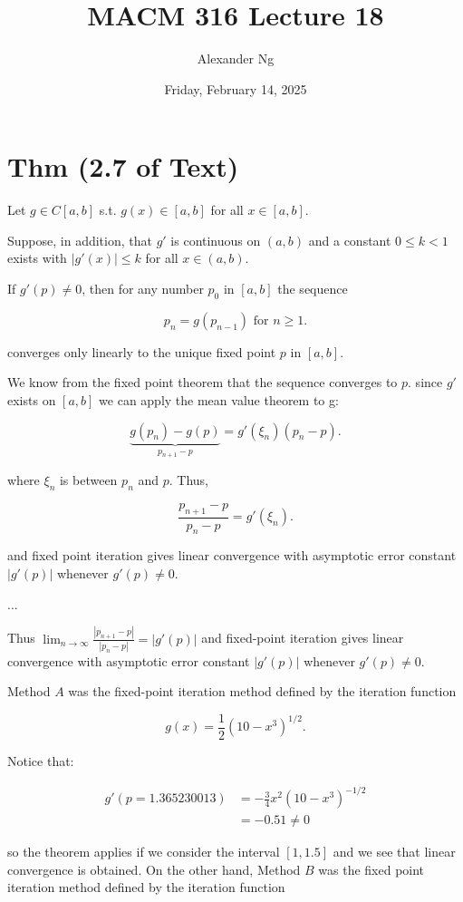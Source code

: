 \documentclass[12pt]{article}
\begin{document}
\title{MACM 316 Lecture 18}
\author{Alexander Ng}
\date{Friday, February 14, 2025}

\maketitle

\section{Thm (2.7 of Text)}

Let $g\in C[a,b]$ s.t. $g(x) \in [a, b]$ for all $x \in [a, b]$.

Suppose, in addition, that $g'$ is continuous on $(a,b)$ and a constant
$0\leq k<1$ exists with $|g'(x)|\leq k$ for all $x\in (a,b)$.

If $g'(p) \neq 0$, then for any number $p_0$ in $[a,b]$ the sequence 

\[
  p_n = g(p_{n-1}) \text{ for } n\geq 1
.\]

converges only linearly to the unique fixed point $p$ in $[a,b]$.

\proof We know from the fixed point theorem that the sequence converges to $p$.
since $g'$ exists on $[a,b]$ we can apply the mean value theorem to g:

\[
\underbrace{g(p_n) - g(p)}_{p_{n+1} - p} = g'(\xi_n)(p_n - p)
.\]

where $\xi_n$ is between $p_n$ and $p$. Thus,

\[
  \frac{p_{n+1}-p}{p_n-p} = g'(\xi_n)
.\]

and fixed point iteration gives linear convergence with asymptotic error
constant $|g'(p)|$ whenever $g'(p) \neq 0$.

\proof...

Thus $\displaystyle \lim_{n\to\infty} \frac{|p_{n+1}-p|}{|p_n-p|} = |g'(p)|$
and fixed-point iteration gives linear convergence with asymptotic error 
constant $|g'(p)|$ whenever $g'(p) \neq 0$.

Method $A$ was the fixed-point iteration method defined by the iteration
function

\[
  g(x) = \frac{1}{2} (10-x^3)^{1/2}
.\]

Notice that:

\begin{align*}
g'(p=1.365230013)
&= -\frac{3}{4}x^2(10-x^3)^{-1/2} \\
&= -0.51 \neq 0
\end{align*}

so the theorem applies if we consider the interval $[1, 1.5]$ and we see that
linear convergence is obtained. On the other hand, Method $B$ was the fixed
point iteration method defined by the iteration function
\end{document}

